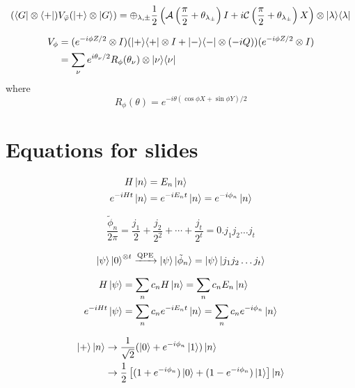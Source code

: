 \documentclass[11pt, oneside]{article}   	%
\begin{document}
\begin{equation*}
(\bra{G} \otimes \bra{+}) V_{\bar{\varphi}} (\ket{+} \otimes \ket{G}) = \oplus_{\lambda, \pm} 
\frac{1}{2} \left( \mathcal{A} \left( \frac{\pi}{2} + \theta_{\lambda_{\pm}} \right) I + i \mathcal{C} \left(\frac{\pi}{2} + \theta_{\lambda_{\pm}} \right) X \right) \otimes \ket{\lambda} \! \bra{\lambda}
\end{equation*}

\begin{align*} 
V_{\phi} 
&= (e^{-i \phi Z/2} \otimes I) (\ket{+} \! \bra{+} \otimes I +  \ket{-} \! \bra{-} \otimes (-iQ)) (e^{-i \phi Z/2} \otimes I) \\
&= \sum_{\nu} e^{i \theta_{\nu}/2} R_{\phi} (\theta_{\nu}) \otimes \ket{\nu} \! \bra{\nu}
\end{align*}
where 
\begin{equation*}
R_{\phi} (\theta) = e^{-i \theta (\cos\phi X + \sin\phi Y)/2} 
\end{equation*}

\section{Equations for slides}
\begin{align*} 
H \ket{n} &= E_n  \ket{n} \\
e^{-i H t} \ket{n} &= e^{-i E_n t} \ket{n} = e^{-i \phi_n} \ket{n}
\end{align*}

\begin{equation*}
\frac{\tilde{\phi}_n}{2 \pi} = \frac{j_1}{2} + \frac{j_2}{2^2} + \cdots + \frac{j_t}{2^t} = 0.j_1 j_2 \dots j_t
\end{equation*}

\begin{align*} 
\ket{\psi} \ket{0}^{\otimes t} \xrightarrow{\textrm{QPE}} \ket{\psi} \ket{\tilde{\phi}_n} = \ket{\psi} \ket{j_1 j_2 \dots j_t}
\end{align*}


\begin{align*} 
H \ket{\psi} & = \sum_n c_n H \ket{n} = \sum_n c_n E_n  \ket{n} \\
e^{-i H t} \ket{\psi} &= \sum_n c_n e^{-i E_n t} \ket{n} = \sum_n c_n e^{-i \phi_n} \ket{n}
\end{align*}

\begin{align*} 
\ket{+} \ket{n} 
& \rightarrow \frac{1}{\sqrt{2}} (\ket{0} + e^{-i \phi_n} \ket{1}) \ket{n} \\
& \rightarrow \frac{1}{2} \left[ (1+e^{-i \phi_n}) \ket{0} + (1-e^{-i \phi_n}) \ket{1} \right] \ket{n} 
\end{align*}
\end{document}
